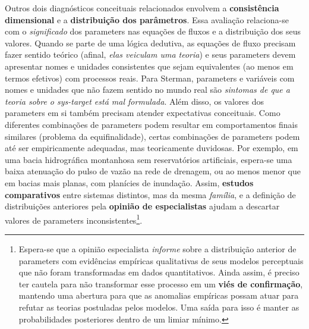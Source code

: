 \documentclass[./main.tex]{subfiles}
\begin{document}
\par Outros dois diagnósticos conceituais relacionados envolvem a \textbf{consistência dimensional} e a \textbf{distribuição dos parâmetros}. Essa avaliação relaciona-se com o \textit{significado} dos \gls{parameters} nas equações de fluxos e a distribuição dos seus valores. Quando se parte de uma lógica dedutiva, as equações de fluxo precisam fazer sentido teórico (afinal, \textit{elas veiculam uma teoria}) e seus \gls{parameters} devem apresentar nomes e unidades consistentes que sejam equivalentes (ao menos em termos efetivos) com processos reais. Para Sterman, \gls{parameters} e variáveis com nomes e unidades que não fazem sentido no mundo real são \textit{sintomas de que a \gls{teoria} sobre o \gls{sys-target} está mal formulada}. Além disso, os valores dos \gls{parameters} em si também precisam atender expectativas conceituais. Como diferentes combinações de \gls{parameters} podem resultar em comportamentos finais similares (problema da equifinalidade), certas combinações de \gls{parameters} podem até ser empiricamente adequadas, mas teoricamente duvidosas. Por exemplo, em uma bacia hidrográfica montanhosa sem reservatórios artificiais, espera-se uma baixa atenuação do pulso de vazão na rede de drenagem, ou ao menos menor que em bacias mais planas, com planícies de inundação. Assim, \textbf{estudos comparativos} entre sistemas distintos, mas da mesma \textit{família}, e a definição de distribuições anteriores pela \textbf{opinião de especialistas} ajudam a descartar valores de \gls{parameters} inconsistentes\footnote{Espera-se que a opinião especialista \textit{informe} sobre a distribuição anterior de \gls{parameters} com evidências empíricas qualitativas de seus modelos perceptuais que não foram transformadas em dados quantitativos. Ainda assim, é preciso ter cautela para não transformar esse processo em um \textbf{viés de confirmação}, mantendo uma abertura para que as anomalias empíricas possam atuar para refutar as teorias postuladas pelos modelos. Uma saída para isso é manter as probabilidades posteriores dentro de um limiar mínimo.}. 
\end{document}
